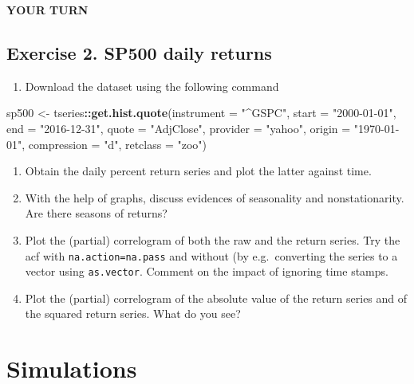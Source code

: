 \documentclass[]{book}
\newenvironment{Shaded}{\begin{snugshade}}{\end{snugshade}}
\newcommand{\KeywordTok}[1]{\textcolor[rgb]{0.13,0.29,0.53}{\textbf{#1}}}
\newcommand{\DataTypeTok}[1]{\textcolor[rgb]{0.13,0.29,0.53}{#1}}
\newcommand{\StringTok}[1]{\textcolor[rgb]{0.31,0.60,0.02}{#1}}
\newcommand{\OperatorTok}[1]{\textcolor[rgb]{0.81,0.36,0.00}{\textbf{#1}}}
\newcommand{\NormalTok}[1]{#1}
\providecommand{\tightlist}{%
  \setlength{\itemsep}{0pt}\setlength{\parskip}{0pt}}
\begin{document}
\textbf{YOUR TURN}

\subsection{Exercise 2. SP500 daily
returns}\label{exercise-2.-sp500-daily-returns}

\begin{enumerate}
\def\labelenumi{\arabic{enumi}.}
\tightlist
\item
  Download the dataset using the following command
\end{enumerate}

\begin{Shaded}
\begin{Highlighting}[]
\NormalTok{sp500 <-}\StringTok{ }\NormalTok{tseries}\OperatorTok{::}\KeywordTok{get.hist.quote}\NormalTok{(}\DataTypeTok{instrument =} \StringTok{"^GSPC"}\NormalTok{, }\DataTypeTok{start =} \StringTok{"2000-01-01"}\NormalTok{, }
    \DataTypeTok{end =} \StringTok{"2016-12-31"}\NormalTok{, }\DataTypeTok{quote =} \StringTok{"AdjClose"}\NormalTok{, }\DataTypeTok{provider =} \StringTok{"yahoo"}\NormalTok{, }\DataTypeTok{origin =} \StringTok{"1970-01-01"}\NormalTok{, }
    \DataTypeTok{compression =} \StringTok{"d"}\NormalTok{, }\DataTypeTok{retclass =} \StringTok{"zoo"}\NormalTok{)}
\end{Highlighting}
\end{Shaded}

\begin{enumerate}
\def\labelenumi{\arabic{enumi}.}
\setcounter{enumi}{1}
\tightlist
\item
  Obtain the daily percent return series and plot the latter against
  time.
\item
  With the help of graphs, discuss evidences of seasonality and
  nonstationarity. Are there seasons of returns?
\item
  Plot the (partial) correlogram of both the raw and the return series.
  Try the acf with \texttt{na.action=na.pass} and without (by
  e.g.~converting the series to a vector using \texttt{as.vector}.
  Comment on the impact of ignoring time stamps.
\item
  Plot the (partial) correlogram of the absolute value of the return
  series and of the squared return series. What do you see?
\end{enumerate}

\section{Simulations}\label{simulations}
\end{document}
